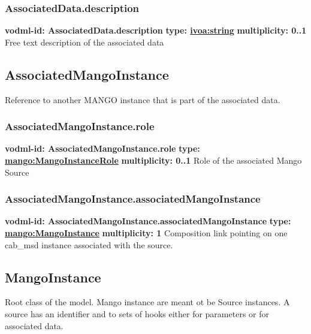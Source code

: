     \subsubsection{AssociatedData.description}
      \textbf{vodml-id: AssociatedData.description} \newline
      \textbf{type: \hyperref[sect:ivoa]{ivoa:string}} \newline
      \textbf{multiplicity: 0..1} \newline 
      Free text description of the associated data

  \subsection{AssociatedMangoInstance}
  \label{sect:AssociatedMangoInstance}
    Reference to another MANGO instance that is part of the associated data.

    \subsubsection{AssociatedMangoInstance.role}
      \textbf{vodml-id: AssociatedMangoInstance.role} \newline
      \textbf{type: \hyperref[sect:MangoInstanceRole]{mango:MangoInstanceRole}} \newline
      \textbf{multiplicity: 0..1} \newline 
      Role of the associated Mango Source

    \subsubsection{AssociatedMangoInstance.associatedMangoInstance}
      \textbf{vodml-id: AssociatedMangoInstance.associatedMangoInstance} \newline
      \textbf{type: \hyperref[sect:MangoInstance]{mango:MangoInstance}} \newline
      \textbf{multiplicity: 1} \newline 
      Composition link pointing on one cab\_msd instance associated with the source.

  \subsection{MangoInstance}
  \label{sect:MangoInstance}
    Root class of the model. Mango instance are meant ot be Source instances. A source has an identifier and to sets of hooks either for parameters or for associated data.

